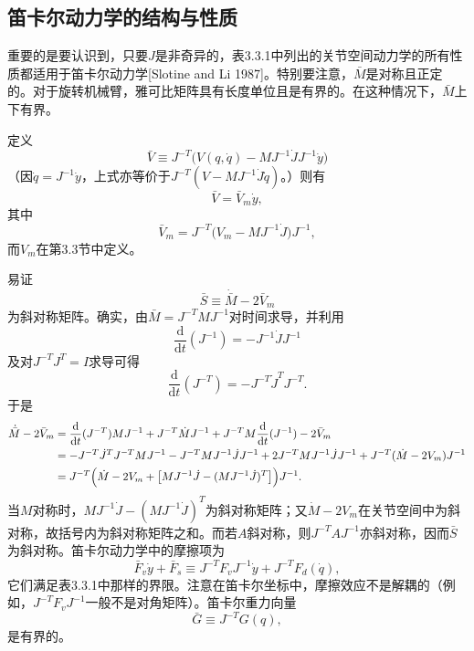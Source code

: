 \documentclass[12pt,a4paper]{ctexart}
\begin{document}
\subsection{笛卡尔动力学的结构与性质}

重要的是要认识到，只要$J$是非奇异的，表3.3.1中列出的关节空间动力学的所有性质都适用于笛卡尔动力学[Slotine and Li 1987]。特别要注意，$\bar{M}$是对称且正定的。对于旋转机械臂，雅可比矩阵具有长度单位且是有界的。在这种情况下，$\bar{M}$上下有界。

定义
\begin{equation}\label{eq:3.5.14}
\bar{V} \equiv J^{-T}\bigl(V(q,\dot{q}) - M J^{-1}\dot{J}J^{-1}\dot{y}\bigr)
\end{equation}
（因$\dot{q}=J^{-1}\dot{y}$，上式亦等价于$J^{-T}(V - M J^{-1}\dot{J}\dot{q})$。）则有
\begin{equation}\label{eq:3.5.15}
\bar{V} = \bar{V}_m\dot{y},
\end{equation}
其中
\begin{equation}\label{eq:3.5.16}
\bar{V}_m = J^{-T}\bigl(V_m - M J^{-1}\dot{J}\bigr)J^{-1},
\end{equation}
而$V_m$在第3.3节中定义。

易证
\begin{equation}\label{eq:3.5.17}
\bar{S} \equiv \dot{\bar{M}} - 2\bar{V}_m
\end{equation}
为斜对称矩阵。确实，由$\bar{M}=J^{-T}MJ^{-1}$对时间求导，并利用
\begin{equation}\label{eq:3.5.18}
\frac{\mathrm{d}}{\mathrm{d}t}(J^{-1}) = -J^{-1}\dot{J}J^{-1}
\end{equation}
及对$J^{-T}J^{T}=I$求导可得
\begin{equation*}
\frac{\mathrm{d}}{\mathrm{d}t}(J^{-T}) = -J^{-T}\dot{J}^{T}J^{-T}.
\end{equation*}
于是
\begin{align*}
\dot{\bar{M}} - 2\bar{V}_m
&= \frac{\mathrm{d}}{\mathrm{d}t}(J^{-T}) M J^{-1} + J^{-T}\dot{M}J^{-1} + J^{-T}M\frac{\mathrm{d}}{\mathrm{d}t}(J^{-1}) - 2\bar{V}_m \\
&= -J^{-T}\dot{J}^{T}J^{-T}MJ^{-1} - J^{-T}MJ^{-1}\dot{J}J^{-1} + 2J^{-T}MJ^{-1}\dot{J}J^{-1} + J^{-T}(\dot{M}-2V_m)J^{-1} \\
&= J^{-T}\Bigl(\dot{M}-2V_m + \bigl[MJ^{-1}\dot{J} - (MJ^{-1}\dot{J})^{T}\bigr]\Bigr)J^{-1}.
\end{align*}
当$M$对称时，$MJ^{-1}\dot{J}-(MJ^{-1}\dot{J})^{T}$为斜对称矩阵；又$\dot{M}-2V_m$在关节空间中为斜对称，故括号内为斜对称矩阵之和。而若$A$斜对称，则$J^{-T}AJ^{-1}$亦斜对称，因而$\bar{S}$为斜对称。笛卡尔动力学中的摩擦项为
\begin{equation}\label{eq:3.5.19}
\bar{F}_v\dot{y} + \bar{F}_s \equiv J^{-T}F_v J^{-1}\dot{y} + J^{-T}F_d(\dot{q}),
\end{equation}
它们满足表3.3.1中那样的界限。注意在笛卡尔坐标中，摩擦效应不是解耦的（例如，$J^{-T}F_vJ^{-1}$一般不是对角矩阵）。笛卡尔重力向量
\begin{equation}\label{eq:3.5.20}
\bar{G} \equiv J^{-T}G(q),
\end{equation}
是有界的。
\end{document}
